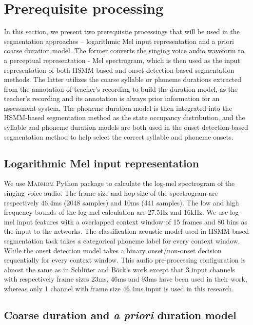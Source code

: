\section{Prerequisite processing}

In this section, we present two prerequisite processings that will be used in the segmentation approaches -- logarithmic Mel input representation and a priori coarse duration model. The former converts the singing voice audio waveform to a perceptual representation - Mel spectrogram, which is then used as the input representation of both HSMM-based and onset detection-based segmentation methods. The latter utilizes the coarse syllable or phoneme durations extracted from the annotation of teacher's recording to build the duration model, as the teacher's recording and its annotation is always prior information for an assessment system. The phoneme duration model is then integrated into the HSMM-based segmentation method as the state occupancy distribution, and the syllable and phoneme duration models are both used in the onset detection-based segmentation method to help select the correct syllable and phoneme onsets.

\subsection{Logarithmic Mel input representation}\label{sec:ch5:input_representation}

We use \textsc{Madmom}\cite{Bock2016} Python package to calculate the log-mel spectrogram of the singing voice audio. The frame size and hop size of the spectrogram are respectively 46.4ms (2048 samples) and 10ms (441 samples). The low and high frequency bounds of the log-mel calculation are 27.5Hz and 16kHz. We use log-mel input features with a overlapped context window of 15 frames and 80 bins as the input to the networks. The classification acoustic model used in HSMM-based segmentation task takes a categorical phoneme label for every context window. While the onset detection model takes a binary onset/non-onset decision sequentially for every context window. This audio pre-processing configuration is almost the same as in Schl\"{u}ter and B\"{o}ck's work\cite{Schluter2014} except that 3 input channels with respectively frame sizes 23ms, 46ms and 93ms have been used in their work, whereas only 1 channel with frame size 46.4ms input is used in this research.

\subsection{Coarse duration and \textit{a priori} duration model}\label{sec:pp_coarse_duration}

